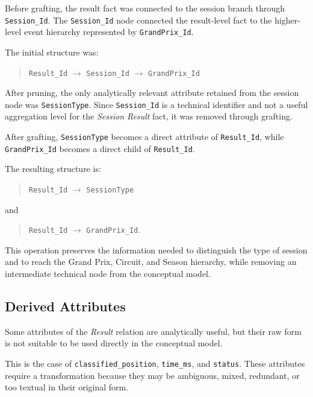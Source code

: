 \documentclass[a4paper,11pt]{article}
\begin{document}
	Before grafting, the result fact was connected to the session branch through
	\texttt{Session\_Id}. The \texttt{Session\_Id} node connected the result-level fact to the
	higher-level event hierarchy represented by \texttt{GrandPrix\_Id}.
	
	The initial structure was:
	
	\begin{quote}
		\texttt{Result\_Id} $\rightarrow$ \texttt{Session\_Id} $\rightarrow$ \texttt{GrandPrix\_Id}
	\end{quote}
	
	After pruning, the only analytically relevant attribute retained from the session node was
	\texttt{SessionType}. Since \texttt{Session\_Id} is a technical identifier and not a useful
	aggregation level for the \textit{Session Result} fact, it was removed through grafting.
	
	After grafting, \texttt{SessionType} becomes a direct attribute of \texttt{Result\_Id}, while
	\texttt{GrandPrix\_Id} becomes a direct child of \texttt{Result\_Id}.
	
	The resulting structure is:
	
	\begin{quote}
		\texttt{Result\_Id} $\rightarrow$ \texttt{SessionType}
	\end{quote}
	
	and
	
	\begin{quote}
		\texttt{Result\_Id} $\rightarrow$ \texttt{GrandPrix\_Id}.
	\end{quote}
	
	This operation preserves the information needed to distinguish the type of session and
	to reach the Grand Prix, Circuit, and Season hierarchy, while removing an intermediate
	technical node from the conceptual model.
		
		
	\subsection{Derived Attributes}
	
	Some attributes of the \textit{Result} relation are analytically useful, but their raw form
	is not suitable to be used directly in the conceptual model.
	
	This is the case of \texttt{classified\_position}, \texttt{time\_ms}, and
	\texttt{status}. These attributes require a transformation because they may be ambiguous,
	mixed, redundant, or too textual in their original form.
	
\end{document}
